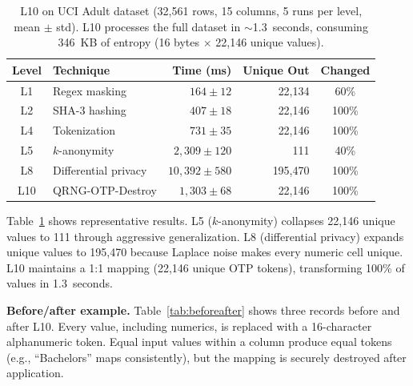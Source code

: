 \documentclass[journal]{IEEEtran}
\begin{document}
\begin{table}[t]
\caption{L10 on UCI Adult dataset (32,561 rows, 15 columns, 5 runs per level, mean $\pm$ std). L10 processes the full dataset in ${\sim}$1.3~seconds, consuming 346~KB of entropy (16 bytes $\times$ 22,146 unique values).}
\label{tab:adult}
\begin{center}
\begin{tabular}{@{}clrrc@{}}
\toprule
\textbf{Level} & \textbf{Technique} & \textbf{Time (ms)} & \textbf{Unique Out} & \textbf{Changed} \\
\midrule
L1  & Regex masking        &  $164 \pm 12$ & 22,134 &  60\% \\
L2  & SHA-3 hashing        &  $407 \pm 18$ & 22,146 & 100\% \\
L4  & Tokenization         &  $731 \pm 35$ & 22,146 & 100\% \\
L5  & $k$-anonymity        & $2{,}309 \pm 120$ &    111 &  40\% \\
L8  & Differential privacy & $10{,}392 \pm 580$ & 195,470 & 100\% \\
L10 & QRNG-OTP-Destroy     & $1{,}303 \pm 68$ & 22,146 & 100\% \\
\bottomrule
\end{tabular}
\end{center}
\end{table}

Table~\ref{tab:adult} shows representative results. L5 ($k$-anonymity) collapses 22,146 unique values to 111 through aggressive generalization. L8 (differential privacy) expands unique values to 195,470 because Laplace noise makes every numeric cell unique. L10 maintains a 1:1 mapping (22,146 unique OTP tokens), transforming 100\% of values in 1.3~seconds.

\textbf{Before/after example.} Table~\ref{tab:beforeafter} shows three records before and after L10. Every value, including numerics, is replaced with a 16-character alphanumeric token. Equal input values within a column produce equal tokens (e.g., ``Bachelors'' maps consistently), but the mapping is securely destroyed after application.
\end{document}
